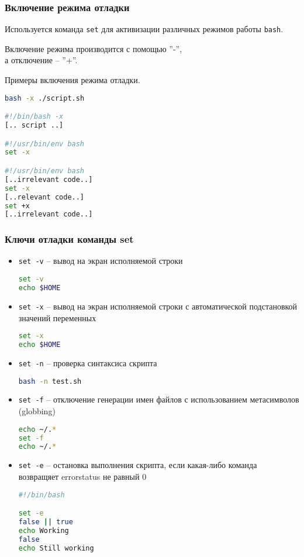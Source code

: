\begin{frame}
	\frametitle{Включение режима отладки}
	Используется команда {\tt set} для активизации различных режимов работы {\tt bash}.

	Включение режима производится с помощью ''-'',\\
	а отключение -- ''+''.

	\begin{block}{Примеры включения режима отладки.}
		\begin{lstlisting}[language=sh]
bash -x ./script.sh

#!/bin/bash -x
[.. script ..]

#!/usr/bin/env bash
set -x

#!/usr/bin/env bash
[..irrelevant code..]
set -x
[..relevant code..]
set +x
[..irrelevant code..]
		\end{lstlisting}
	\end{block}
\end{frame}

\begin{frame}
	\frametitle{Ключи отладки команды set}

	\begin{itemize}
		\item {\tt set -v} -- вывод на экран исполняемой строки
			\begin{lstlisting}[language=sh]
set -v
echo $HOME
			\end{lstlisting}

		\item {\tt set -x} -- вывод на экран исполняемой строки с автоматической подстановкой значений переменных
\begin{lstlisting}[language=sh]
set -x
echo $HOME
\end{lstlisting}

		\item {\tt set -n} -- проверка синтаксиса скрипта
\begin{lstlisting}[language=sh]
bash -n test.sh
\end{lstlisting} 


		\item {\tt set -f} -- отключение генерации имен файлов с использованием метасимволов (globbing)
\begin{lstlisting}[language=sh]
echo ~/.*
set -f
echo ~/.*
\end{lstlisting} 
		\framebreak
		\item {\tt set -e} -- остановка выполнения скрипта, если какая-либо команда 
		возвращяет errorstatus не равный 0
			\begin{lstlisting}[language=sh]
#!/bin/bash

set -e
false || true
echo Working
false
echo Still working
			\end{lstlisting} 
	\end{itemize}
\end{frame}

